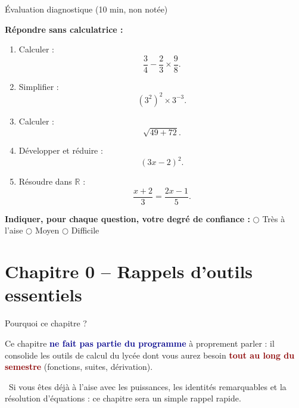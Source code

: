 \documentclass[aspectratio=169,11pt]{beamer}
\newcommand{\important}[1]{\textcolor{DarkRed}{\textbf{#1}}}
\newcommand{\key}[1]{\textcolor{DarkBlue}{\textbf{#1}}}
\begin{document}
	
	\begin{frame}{Évaluation diagnostique (10 min, non notée)}
		
		\textbf{Répondre sans calculatrice :}
		
		\vspace{0.3cm}
		
		\begin{enumerate}
			\item Calculer :
			\[
			\frac{3}{4}-\frac{2}{3}\times\frac{9}{8}.
			\]
			
			\item Simplifier :
			\[
			(3^2)^2\times 3^{-3}.
			\]
			
			\item Calculer :
			\[
			\sqrt{49+72}.
			\]
			
			\item Développer et réduire :
			\[
			(3x-2)^2.
			\]
			
			\item Résoudre dans $\mathbb{R}$ :
			\[
			\frac{x+2}{3}=\frac{2x-1}{5}.
			\]
		\end{enumerate}
		
		\vfill
		
		\begin{center}
			\textbf{Indiquer, pour chaque question, votre degré de confiance :}
			\qquad
			$\bigcirc$ Très à l'aise
			\quad
			$\bigcirc$ Moyen
			\quad
			$\bigcirc$ Difficile
		\end{center}
		
	\end{frame}
	
	
	
	
	\section{Chapitre 0 -- Rappels d'outils essentiels}
	
	
	
	
	
	
	
	
	\begin{frame}{Pourquoi ce chapitre ?}
		\begin{definitionbox}
			Ce chapitre \key{ne fait pas partie du programme} à proprement parler : il consolide les
			outils de calcul du lycée dont vous aurez besoin \important{tout au long du semestre}
			(fonctions, suites, dérivation).
		\end{definitionbox}
		
		\vspace{0.3cm}
		\begin{applicationbox}
			\faLightbulb\ Si vous êtes déjà à l'aise avec les puissances, les identités remarquables
			et la résolution d'équations : ce chapitre sera un simple rappel rapide.
		\end{applicationbox}
	\end{frame}
	
\end{document}
